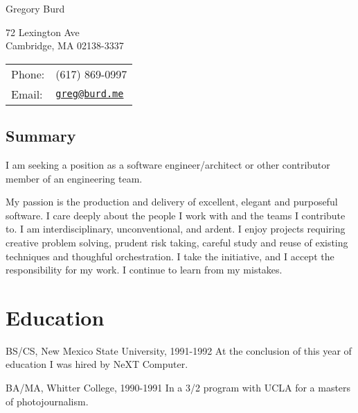\documentclass[letterpaper]{article}
\def\name{Gregory Burd}
\renewenvironment{itemize}{
  \begin{list}{}{
    \setlength{\leftmargin}{1.5em}
  }
}{
  \end{list}
}
\begin{document}
{\huge \name}


\vspace{0.25in}

\begin{minipage}{0.45\linewidth}
  72 Lexington Ave \\
  Cambridge, MA 02138-3337
\end{minipage}
\begin{minipage}{0.45\linewidth}
  \begin{tabular}{ll}
    Phone: & (617) 869-0997 \\
    Email: & \href{mailto:greg@burd.me}{\tt greg@burd.me} \\
  \end{tabular}
\end{minipage}

\vspace{0.25in}

\subsection*{Summary}

\begin{itemize}

\item I am seeking a position as a software engineer/architect or other
  contributor member of an engineering team.

\item My passion is the production and delivery of excellent, elegant and
  purposeful software. I care deeply about the people I work with and the teams
  I contribute to. I am interdisciplinary, unconventional, and ardent. I enjoy
  projects requiring creative problem solving, prudent risk taking, careful
  study and reuse of existing techniques and thoughful orchestration. I take
  the initiative, and I accept the responsibility for my work. I continue to
  learn from my mistakes.

\end{itemize}


\section*{Education}

\begin{itemize}
  \item BS/CS, New Mexico State University, 1991-1992
    At the conclusion of this year of education I was hired by NeXT Computer.

  \item BA/MA, Whitter College, 1990-1991
    In a 3/2 program with UCLA for a masters of photojournalism.
\end{itemize}
\end{document}
